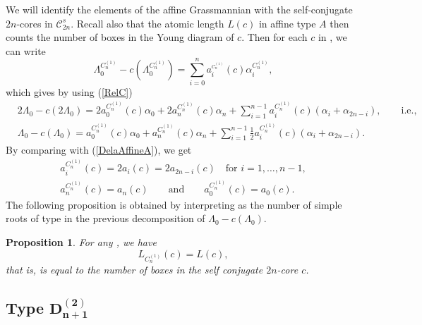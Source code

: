 \documentclass[pdftex]{sigma}
\newtheorem{Proposition}[Theorem]{Proposition}
 { \theoremstyle{definition}
\newtheorem{Definition}[Theorem]{Definition}
\newtheorem{Note}[Theorem]{Note}
\newtheorem{Example}[Theorem]{Example}
\newtheorem{Remark}[Theorem]{Remark} }
\numberwithin{equation}{section}
\begin{document}
We will identify the elements of the affine Grassmannian 
with the self-conjugate $2n$-cores in $\mathcal{C}%
_{2n}^{s}$. Recall also that the atomic length $L(c)$ in affine type $A$
then counts the number of boxes in the Young diagram of $c$. Then for each $c
$ in , we can write%
\begin{equation*}
\Lambda _{0}^{C_{n}^{(1)}}-c(\Lambda
_{0}^{C_{n}^{(1)}})=\sum_{i=0}^{n}a_{i}^{_{C_{n}^{(1)}}}(c)\alpha
_{i}^{C_{n}^{(1)}},
\end{equation*}%
which gives by using (\ref{RelC})%
\begin{align*}
	&2\Lambda _{0}-c(2\Lambda _{0})=2a_{0}^{C_{n}^{(1)}}(c)\alpha
	_{0}+2a_{n}^{C_{n}^{(1)}}(c)\alpha
	_{n}+\sum_{i=1}^{n-1}a_{i}^{C_{n}^{(1)}}(c)(\alpha _{i}+\alpha _{2n-i}), \qquad\text{i.e.,} \\
	&\Lambda _{0}-c(\Lambda _{0})=a_{0}^{C_{n}^{(1)}}(c)\alpha
	_{0}+a_{n}^{C_{n}^{(1)}}(c)\alpha _{n}+\sum_{i=1}^{n-1}\frac{1}{2}
	a_{i}^{C_{n}^{(1)}}(c)(\alpha _{i}+\alpha _{2n-i}).
\end{align*}
By comparing with (\ref{DelaAffineA}), we get
\begin{gather*}
a_{i}^{C_{n}^{(1)}}(c)=2a_{i}(c)=2a_{2n-i}(c)\quad \text{for }i=1,\dots ,n-1, \\
a_{n}^{C_{n}^{(1)}}(c)=a_{n}(c) \qquad \text{and} \qquad a_{0}^{C_{n}^{(1)}}(c)=a_{0}(c).
\end{gather*}
The following proposition is obtained by interpreting 
as the number of simple roots of type  in the previous
decomposition of $\Lambda _{0}-c(\Lambda _{0})$.

\begin{Proposition}
	\label{Prop_C(n,1)}For any , we have
	\begin{equation*}
	L_{C_{n}^{(1)}}(c)=L(c), %
	\end{equation*}%
	that is,  is equal to the number of boxes in the self
	conjugate $2n$-core $c$.
\end{Proposition}

\subsection[Type D\_\{n+1\}\^{}(2)]{Type $\boldsymbol{D_{n+1}^{(2)}}$}
\end{document}

